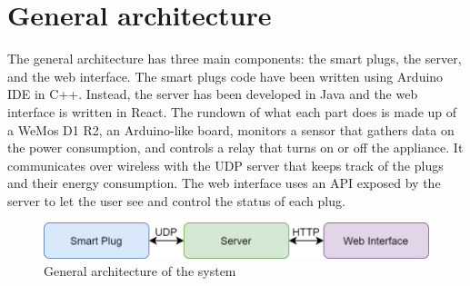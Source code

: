 \documentclass[conference]{IEEEtran}
\begin{document}
	\section{General architecture}
	The general architecture has three main components: the smart plugs, the server, and the web interface. The smart plugs code have been written using Arduino IDE in C++. Instead, the server has been developed in Java and the web interface is written in React. The rundown of what each part does is made up of a WeMos D1 R2, an Arduino-like board, monitors a sensor that gathers data on the power consumption, and controls a relay that turns on or off the appliance. It communicates over wireless with the UDP server that keeps track of the plugs and their energy consumption. The web interface uses an API exposed by the server to let the user see and control the status of each plug.
	\begin{figure}[htbp]
		\centering
		\includegraphics[width=\linewidth]{assets/architecture_schema}
		\caption{General architecture of the system}
		\label{fig:architecture_schema}
	\end{figure}
	
\end{document}
